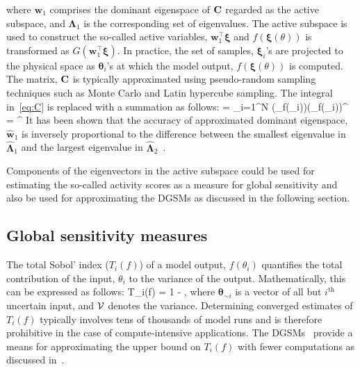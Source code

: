  \ee
 where $\bm{w}_1$ comprises the dominant eigenspace of $\mathbf{{C}}$ regarded as the active subspace,
 and $\bm{\Lambda}_1$ is the corresponding set of eigenvalues. The active subspace is used to 
 construct the so-called active variables, $\bm{w}_1^\top \bm{\xi}$ and $f(\bm{\xi}(\theta))$ is transformed
 as $G(\bm{w}_1^\top \bm{\xi})$. In practice, the set of samples, $\bm{\xi}_i$'s are projected to the
 physical space as $\bm{\theta}_i$'s at which the model output, $f(\bm{\xi}(\theta))$ is computed. 
 The matrix, $\mathbf{{C}}$ is typically approximated using pseudo-random sampling techniques such 
 as Monte Carlo and Latin hypercube sampling. The integral in~\eqref{eq:C} is replaced with a
 summation as follows:
 \be
 \approx {} = \sum\limits_{i=1}^{N} 
 (\nabla_{\bm{\xi}}f(\bm{\xi}_i))(\nabla_{\bm{\xi}}f(\bm{\xi}_i))^\top
 = \hat{\bm{\Lambda}}^\top
\label{eq:chat}
 \ee
 It has been shown that the accuracy of approximated dominant eigenspace, $\hat{\bm{w}}_1$ is inversely
 proportional to the difference between the smallest eigenvalue in $\hat{\bm{\Lambda}}_1$ and the
 largest eigenvalue in $\hat{\bm{\Lambda}}_2$~\cite{Constantine:2014}. 
 
 Components of the eigenvectors
 in the active subspace could be used for estimating the so-called activity scores as a measure for
 global sensitivity and also be used for approximating the DGSMs as discussed in the following section.
  
\subsection{Global sensitivity measures}
\label{sub:gsa}
The total Sobol' index ($T_i(f)$) of a model output, $f(\theta_i)$ quantifies the total contribution of the
input, $\theta_i$ to the variance of the output. Mathematically, this can be expressed as follows:
%
\be
T_i(f) = 1 - 
,
\label{eq:total}
\ee
%
where $\bm{\theta}_{\sim i}$ is a vector of all but $i^\text{th}$ uncertain input, and $\mathcal{V}$ denotes the variance.
Determining converged estimates of $T_i(f)$ typically involves tens of thousands of model runs and is therefore
prohibitive in the case of compute-intensive applications. The DGSMs~\cite{Sobol:2009}
provide a means for approximating the upper bound on $T_i(f)$ with fewer computations as 
discussed in~\cite{Vohra:2018}. 
\smallskip

